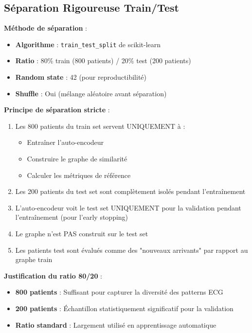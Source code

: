 \documentclass[12pt,a4paper]{article}
\begin{document}
\subsection{Séparation Rigoureuse Train/Test}

\textbf{Méthode de séparation} :
\begin{itemize}
    \item \textbf{Algorithme} : \texttt{train\_test\_split} de scikit-learn
    \item \textbf{Ratio} : 80\% train (800 patients) / 20\% test (200 patients)
    \item \textbf{Random state} : 42 (pour reproductibilité)
    \item \textbf{Shuffle} : Oui (mélange aléatoire avant séparation)
\end{itemize}

\textbf{Principe de séparation stricte} :
\begin{enumerate}
    \item Les 800 patients du train set servent UNIQUEMENT à :
    \begin{itemize}
        \item Entraîner l'auto-encodeur
        \item Construire le graphe de similarité
        \item Calculer les métriques de référence
    \end{itemize}
    \item Les 200 patients du test set sont complètement isolés pendant l'entraînement
    \item L'auto-encodeur voit le test set UNIQUEMENT pour la validation pendant l'entraînement (pour l'early stopping)
    \item Le graphe n'est PAS construit sur le test set
    \item Les patients test sont évalués comme des "nouveaux arrivants" par rapport au graphe train
\end{enumerate}

\textbf{Justification du ratio 80/20} :
\begin{itemize}
    \item \textbf{800 patients} : Suffisant pour capturer la diversité des patterns ECG
    \item \textbf{200 patients} : Échantillon statistiquement significatif pour la validation
    \item \textbf{Ratio standard} : Largement utilisé en apprentissage automatique
\end{itemize}
\end{document}
